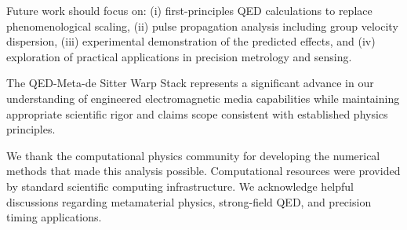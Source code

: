 \documentclass[aps,prl,reprint,groupedaddress]{revtex4-1}
\begin{document}
Future work should focus on: (i) first-principles QED calculations to replace phenomenological scaling, (ii) pulse propagation analysis including group velocity dispersion, (iii) experimental demonstration of the predicted effects, and (iv) exploration of practical applications in precision metrology and sensing.

The QED-Meta-de Sitter Warp Stack represents a significant advance in our understanding of engineered electromagnetic media capabilities while maintaining appropriate scientific rigor and claims scope consistent with established physics principles.

\begin{acknowledgments}
We thank the computational physics community for developing the numerical methods that made this analysis possible. Computational resources were provided by standard scientific computing infrastructure. We acknowledge helpful discussions regarding metamaterial physics, strong-field QED, and precision timing applications.
\end{acknowledgments}
\end{document}
